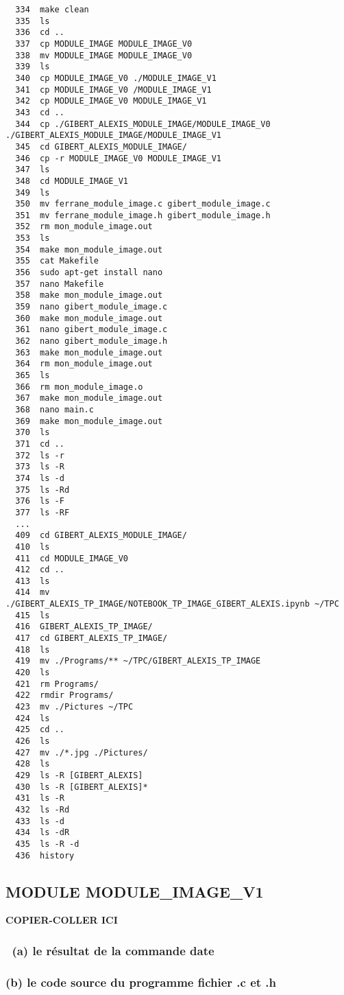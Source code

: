 \documentclass[11pt]{article}
\begin{document}
\begin{verbatim}
  334  make clean
  335  ls
  336  cd ..
  337  cp MODULE_IMAGE MODULE_IMAGE_V0
  338  mv MODULE_IMAGE MODULE_IMAGE_V0
  339  ls
  340  cp MODULE_IMAGE_V0 ./MODULE_IMAGE_V1
  341  cp MODULE_IMAGE_V0 /MODULE_IMAGE_V1
  342  cp MODULE_IMAGE_V0 MODULE_IMAGE_V1
  343  cd ..
  344  cp ./GIBERT_ALEXIS_MODULE_IMAGE/MODULE_IMAGE_V0 ./GIBERT_ALEXIS_MODULE_IMAGE/MODULE_IMAGE_V1
  345  cd GIBERT_ALEXIS_MODULE_IMAGE/
  346  cp -r MODULE_IMAGE_V0 MODULE_IMAGE_V1
  347  ls
  348  cd MODULE_IMAGE_V1
  349  ls
  350  mv ferrane_module_image.c gibert_module_image.c
  351  mv ferrane_module_image.h gibert_module_image.h
  352  rm mon_module_image.out 
  353  ls
  354  make mon_module_image.out
  355  cat Makefile 
  356  sudo apt-get install nano
  357  nano Makefile 
  358  make mon_module_image.out
  359  nano gibert_module_image.c
  360  make mon_module_image.out
  361  nano gibert_module_image.c
  362  nano gibert_module_image.h
  363  make mon_module_image.out
  364  rm mon_module_image.out 
  365  ls
  366  rm mon_module_image.o 
  367  make mon_module_image.out
  368  nano main.c
  369  make mon_module_image.out
  370  ls
  371  cd ..
  372  ls -r
  373  ls -R
  374  ls -d
  375  ls -Rd
  376  ls -F
  377  ls -RF
  ...
  409  cd GIBERT_ALEXIS_MODULE_IMAGE/
  410  ls
  411  cd MODULE_IMAGE_V0
  412  cd ..
  413  ls
  414  mv ./GIBERT_ALEXIS_TP_IMAGE/NOTEBOOK_TP_IMAGE_GIBERT_ALEXIS.ipynb ~/TPC
  415  ls
  416  GIBERT_ALEXIS_TP_IMAGE/
  417  cd GIBERT_ALEXIS_TP_IMAGE/
  418  ls
  419  mv ./Programs/** ~/TPC/GIBERT_ALEXIS_TP_IMAGE
  420  ls
  421  rm Programs/
  422  rmdir Programs/
  423  mv ./Pictures ~/TPC
  424  ls
  425  cd ..
  426  ls
  427  mv ./*.jpg ./Pictures/
  428  ls
  429  ls -R [GIBERT_ALEXIS]
  430  ls -R [GIBERT_ALEXIS]*
  431  ls -R
  432  ls -Rd
  433  ls -d
  434  ls -dR
  435  ls -R -d
  436  history
\end{verbatim}

    \subsection{MODULE MODULE\_IMAGE\_V1}\label{module-module_image_v1}

\textbf{COPIER-COLLER ICI}

\subsubsection{~(a) le résultat de la commande
date}\label{a-le-ruxe9sultat-de-la-commande-date}

\subsubsection{(b) le code source du programme fichier .c et
.h}\label{b-le-code-source-du-programme-fichier-.c-et-.h}
\end{document}
